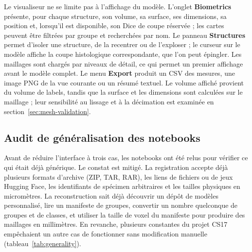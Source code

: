 \documentclass[12pt,a4paper]{report}
\begin{document}
Le visualiseur ne se limite pas à l'affichage du modèle. L'onglet \textbf{Biometrics} présente, pour chaque structure, son volume, sa surface, ses dimensions, sa position et, lorsqu'il est disponible, son Dice de coupe réservée ; les cartes peuvent être filtrées par groupe et recherchées par nom. Le panneau \textbf{Structures} permet d'isoler une structure, de la recentrer ou de l'exploser ; le curseur sur le modèle affiche la coupe histologique correspondante, que l'on peut épingler. Les maillages sont chargés par niveaux de détail, ce qui permet un premier affichage avant le modèle complet. Le menu \textbf{Export} produit un CSV des mesures, une image PNG de la vue courante ou un résumé textuel. Le volume affiché provient du volume de labels, tandis que la surface et les dimensions sont calculées sur le maillage ; leur sensibilité au lissage et à la décimation est examinée en section~\ref{sec:mesh-validation}.

\subsection{Audit de généralisation des notebooks}

Avant de réduire l'interface à trois cas, les notebooks ont été relus pour vérifier ce qui était déjà générique. Le constat est mitigé. La registration accepte déjà plusieurs formats d'archive (ZIP, TAR, RAR), les liens de fichiers ou de jeux Hugging Face, les identifiants de spécimen arbitraires et les tailles physiques en micromètres. La reconstruction sait déjà découvrir un dépôt de modèles personnalisé, lire un manifeste de groupes, convertir un nombre quelconque de groupes et de classes, et utiliser la taille de voxel du manifeste pour produire des maillages en millimètres. En revanche, plusieurs constantes du projet CS17 empêchaient un autre cas de fonctionner sans modification manuelle (tableau~\ref{tab:generality}).
\end{document}
